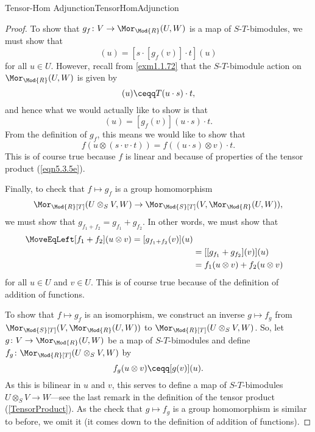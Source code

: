 \begin{thm}{Tensor-Hom Adjunction}{TensorHomAdjunction}
\begin{proof}
		To show that $g_f\colon V\rightarrow \Mor _{\Mod{R}}(U,W)$ is a map of $S$-$T$-bimodules, we must show that
		\begin{equation}
			[g_f(s\cdot v\cdot t)](u)=[s\cdot [g_f(v)]\cdot t](u)
		\end{equation}
		for all $u\in U$.  However, recall from \cref{exm1.1.72} that the $S$-$T$-bimodule action on $\Mor _{\Mod{R}}(U,W)$ is given by
		\begin{equation}
			[s\cdot T\cdot t](u)\ceqq T(u\cdot s)\cdot t,
		\end{equation}
		and hence what we would actually like to show is that
		\begin{equation}
			[g_f(s\cdot v\cdot t)](u)=[g_f(v)](u\cdot s)\cdot t.
		\end{equation}
		From the definition of $g_f$, this means we would like to show that
		\begin{equation}
			f\left( u\otimes (s\cdot v\cdot t)\right) =f\left( (u\cdot s)\otimes v\right) \cdot t.
		\end{equation}
		This is of course true because $f$ is linear and because of properties of the tensor product (\eqref{eqn5.3.5e}).
		
		Finally, to check that $f\mapsto g_f$ is a group homomorphism
		\begin{equation*}
			\Mor _{\Mod{R}[T]}(U\otimes _SV,W)\rightarrow \Mor _{\Mod{S}[T]}(V,\Mor _{\Mod{R}}(U,W)),
		\end{equation*}
		we must show that $g_{f_1+f_2}=g_{f_1}+g_{f_2}$.  In other words, we must show that
		\begin{equation}
			\begin{split}
				\MoveEqLeft
				[f_1+f_2](u\otimes v)=[g_{f_1+f_2}(v)](u) \\
				& =[[g_{f_1}+g_{f_2}](v)](u) \\
				& =f_1(u\otimes v)+f_2(u\otimes v)
			\end{split}
		\end{equation}
		for all $u\in U$ and $v\in U$.  This is of course true because of the definition of addition of functions.
		
		To show that $f\mapsto g_f$ is an isomorphism, we construct an inverse $g\mapsto f_g$ from $\Mor _{\Mod{S}[T]}(V,\Mor _{\Mod{R}}(U,W))$ to $\Mor _{\Mod{R}[T]}(U\otimes _SV,W)$.  So, let $g\colon V\rightarrow \Mor _{\Mod{R}}(U,W)$ be a map of $S$-$T$-bimodules and define $f_g\colon \Mor _{\Mod{R}[T]}(U\otimes _SV,W)$ by
		\begin{equation}
			f_g(u\otimes v)\ceqq [g(v)](u).
		\end{equation}
		As this is bilinear in $u$ and $v$, this serves to define a map of $S$-$T$-bimodules $U\otimes _SV\rightarrow W$---see the last remark in the definition of the tensor product (\cref{TensorProduct}).  As the check that $g\mapsto f_g$ is a group homomorphism is similar to before, we omit it (it comes down to the definition of addition of functions).
		

\end{proof}
\end{thm}
